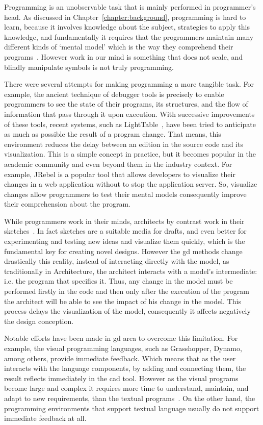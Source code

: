Programming is an unobservable task that is mainly performed in programmer's head. As discussed in Chapter~\ref{chapter:background}, programming is hard to learn, because it involves knowledge about the subject, strategies to apply this knowledge, and fundamentally it requires that the programmers maintain many different kinds of ‘mental model’ which is the way they comprehend their programs~\citep{robins2003learning}. However work in our mind is something that does not scale, and blindly manipulate symbols is not truly programming.

There were several attempts for making programming a more tangible task. For example, the ancient technique of debugger tools is precisely to enable programmers to see the state of their programs, its structures, and the flow of information that pass through it upon execution. With successive improvements of these tools, recent systems, such as LightTable~\citep{lighttable}, have been tried to anticipate as much as possible the result of a program change. That means, this environment reduces the delay between an edition in the source code and its visualization. This is a simple concept in practice, but it becomes popular in the academic community and even beyond them in the industry context. For example, JRebel is a popular tool that allows developers to visualize their changes in a web application without to stop the application server. So, visualize changes allow programmers to test their mental models consequently improve their comprehension about the program.

While programmers work in their minds, architects by contrast work in their sketches~\citep{do2001thinking}. In fact sketches are a suitable media for drafts, and even better for experimenting and testing new ideas and visualize them quickly, which is the fundamental key for creating novel designs. However the \gls{gd} methods change drastically this reality, instead of interacting directly with the model, as traditionally in Architecture, the architect interacts with a model's intermediate: i.e. the program that specifies it. Thus, any change in the model must be performed firstly in the code and then only after the execution of the program the architect will be able to see the impact of his change in the model. This process delays the visualization of the model, consequently it affects negatively the design conception.

Notable efforts have been made in \gls{gd} area to overcome this limitation. For example, the visual programming languages, such as Grasshopper, Dynamo, among others, provide immediate feedback. Which means that as the user interacts with the language components, by adding and connecting them, the result reflects immediately in the \gls{cad} tool. However as the visual programs become large and complex it requires more time to understand, maintain, and adapt to new requirements, than the textual programs~\citep{leitao2011programming}. On the other hand, the programming environments that support textual language usually do not support immediate feedback at all.

